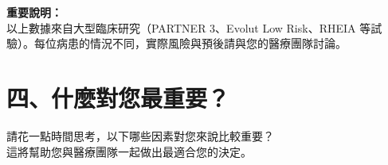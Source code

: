 \documentclass[12pt,a4paper]{article}
\begin{document}
\vspace{0.5cm}

\begin{tcolorbox}[colback=yellow!10, colframe=pda_orange, arc=8pt]
\textbf{\textcolor{pda_orange}{重要說明：}}\\[0.3cm]
以上數據來自大型臨床研究（PARTNER 3、Evolut Low Risk、RHEIA 等試驗）。每位病患的情況不同，實際風險與預後請與您的醫療團隊討論。
\end{tcolorbox}

\newpage

\section*{\textcolor{emergency_red}{\Large 四、什麼對您最重要？}}

\begin{center}
{\large 請花一點時間思考，以下哪些因素對您來說比較重要？}\\[0.3cm]
{\normalsize 這將幫助您與醫療團隊一起做出最適合您的決定。}
\end{center}

\vspace{0.5cm}
\end{document}
